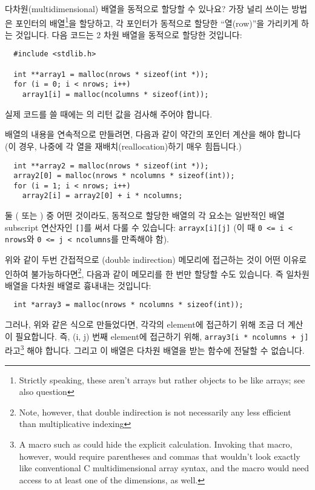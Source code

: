 \begin{faq}
	다차원(multidimensional) 배열을 동적으로 할당할 수 있나요?
\A
	가장 널리 쓰이는 방법은 포인터의 배열\footnote{Strictly speaking,
	  these aren't arrays but rather objects to be  like arrays;
	  see also question }을 할당하고, 각 포인터가 동적으로
	할당한 ``열(row)''을 가리키게 하는 것입니다.  다음 코드는 2 차원
	배열을 동적으로 할당한 것입니다:
\begin{verbatim}
  #include <stdlib.h>

  int **array1 = malloc(nrows * sizeof(int *));
  for (i = 0; i < nrows; i++)
    array1[i] = malloc(ncolumns * sizeof(int));
\end{verbatim}
	\noindent 실제 코드를 쓸 때에는 의 리턴 값을 검사해
	주어야 합니다.

	배열의 내용을 연속적으로 만들려면, 다음과 같이 약간의 포인터
	계산을 해야 합니다 (이 경우, 나중에 각 열을 재배치(reallocation)하기
	매우 힘듭니다.)

\begin{verbatim}
  int **array2 = malloc(nrows * sizeof(int *));
  array2[0] = malloc(nrows * ncolumns * sizeof(int));
  for (i = 1; i < nrows; i++)
    array2[i] = array2[0] + i * ncolumns;
\end{verbatim}

	\noindent 둘 ( 또는 ) 중 어떤 것이라도,
	동적으로 할당한 배열의 각 요소는
	일반적인 배열 subscript 연산자인 \verb+[]+를 써서 다룰 수 있습니다:
	\verb+arrayx[i][j]+ (이 때 \verb+0 <= i < nrows+와
	\verb+0 <= j < ncolumns+를 만족해야 함).


	위와 같이 두번 간접적으로 (double indirection) 메모리에 접근하는 것이
	어떤 이유로 인하여
	불가능하다면\footnote{Note, however, that double indirection is not
	  necessarily any less efficient than multiplicative indexing},
	다음과 같이 메모리를 한 번만 할당할 수도 있습니다.
	즉 일차원 배열을 다차원 배열로 흉내내는 것입니다:

\begin{verbatim}
  int *array3 = malloc(nrows * ncolumns * sizeof(int));
\end{verbatim}

	그러나, 위와 같은 식으로 만들었다면,
        각각의 element에 접근하기 위해 조금 더 계산이 필요합니다. 즉,
	(i, j) 번째 element에 접근하기 위해,
	\verb#array3[i * ncolumns + j]#라고\footnote{A macro such as
	  could hide the explicit calculation. Invoking that macro, however,
	  would require parentheses and commas that wouldn't look exactly
	  like conventional C multidimensional array syntax, and the macro
	  would need access to at least one of the dimensions, as well.}
	해야 합니다. 그리고 이 배열은 다차원 배열을 받는 함수에 전달할 수
	없습니다. 


\end{faq}
